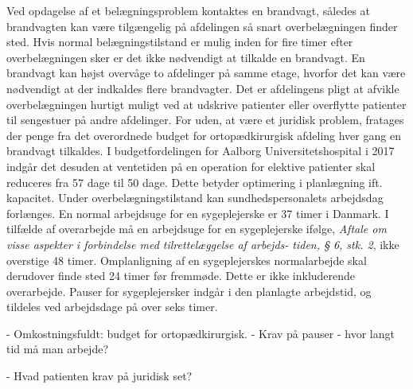Ved opdagelse af et belægningsproblem kontaktes en brandvagt, således at brandvagten kan være tilgængelig på afdelingen så snart overbelægningen finder sted. Hvis normal belægningstilstand er mulig inden for fire timer efter overbelægningen sker er det ikke nødvendigt at tilkalde en brandvagt. En brandvagt kan højst overvåge to afdelinger på samme etage, hvorfor det kan være nødvendigt at der indkaldes flere brandvagter. Det er afdelingens pligt at  afvikle overbelægningen hurtigt muligt ved at udskrive patienter eller overflytte patienter til sengestuer på andre afdelinger. \cite{Beredskab2016} For uden, at være et juridisk problem, fratages der penge fra det overordnede budget for ortopædkirurgisk afdeling hver gang en brandvagt tilkaldes. \cite{KILDE - er i tvivl om det går ud over den enkelte afdeling eller om det er samlet budget for sygehuset??} I budgetfordelingen for Aalborg Universitetshospital i 2017 indgår det desuden at ventetiden på en operation for elektive patienter skal reduceres fra 57 dage til 50 dage. \cite{Budget2016} Dette betyder optimering i planlægning ift. kapacitet. Under overbelægningstilstand kan sundhedspersonalets arbejdsdag forlænges. \cite{Kjeldsen2015} En normal arbejdsuge for en sygeplejerske er 37 timer i Danmark. \cite{Danske2015} I tilfælde af overarbejde må en arbejdsuge for en sygeplejerske ifølge, \textit {Aftale om visse aspekter i forbindelse med tilrettelæggelse af arbejds- tiden, § 6, stk. 2}, ikke overstige 48 timer. Omplanligning af en sygeplejerskes normalarbejde skal derudover finde sted 24 timer før fremmøde. Dette er ikke inkluderende overarbejde. Pauser for sygeplejersker indgår i den planlagte arbejdstid, og tildeles ved arbejdsdage på over seks timer. 

- Omkostningsfuldt: budget for ortopædkirurgisk.
- Krav på pauser - hvor langt tid må man arbejde?

- Hvad patienten krav på juridisk set?







